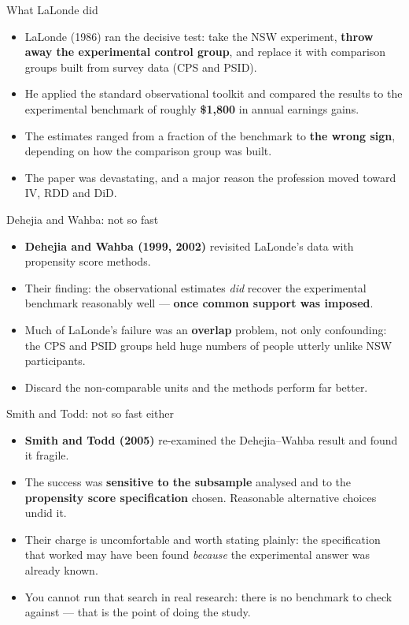 \documentclass[
  11pt,
  ignorenonframetext,
  aspectratio=169,
]{beamer}
\providecommand{\tightlist}{%
  \setlength{\itemsep}{0pt}\setlength{\parskip}{0pt}}
\begin{document}
\begin{frame}{What LaLonde did}
\protect{}\label{what-lalonde-did}
\begin{itemize}
\tightlist
\item
  LaLonde (1986) ran the decisive test: take the NSW experiment,
  \textbf{throw away the experimental control group}, and replace it
  with comparison groups built from survey data (CPS and PSID).
\item
  He applied the standard observational toolkit and compared the results
  to the experimental benchmark of roughly \textbf{\$1,800} in annual
  earnings gains.
\item
  The estimates ranged from a fraction of the benchmark to \textbf{the
  wrong sign}, depending on how the comparison group was built.
\item
  The paper was devastating, and a major reason the profession moved
  toward IV, RDD and DiD.
\end{itemize}
\end{frame}

\begin{frame}{Dehejia and Wahba: not so fast}
\protect{}\label{dehejia-and-wahba-not-so-fast}
\begin{itemize}
\tightlist
\item
  \textbf{Dehejia and Wahba (1999, 2002)} revisited LaLonde's data with
  propensity score methods.
\item
  Their finding: the observational estimates \emph{did} recover the
  experimental benchmark reasonably well --- \textbf{once common support
  was imposed}.
\item
  Much of LaLonde's failure was an \textbf{overlap} problem, not only
  confounding: the CPS and PSID groups held huge numbers of people
  utterly unlike NSW participants.
\item
  Discard the non-comparable units and the methods perform far better.
\end{itemize}
\end{frame}

\begin{frame}{Smith and Todd: not so fast either}
\protect{}\label{smith-and-todd-not-so-fast-either}
\begin{itemize}
\tightlist
\item
  \textbf{Smith and Todd (2005)} re-examined the Dehejia--Wahba result
  and found it fragile.
\item
  The success was \textbf{sensitive to the subsample} analysed and to
  the \textbf{propensity score specification} chosen. Reasonable
  alternative choices undid it.
\item
  Their charge is uncomfortable and worth stating plainly: the
  specification that worked may have been found \emph{because} the
  experimental answer was already known.
\item
  You cannot run that search in real research: there is no benchmark to
  check against --- that is the point of doing the study.
\end{itemize}
\end{frame}
\end{document}
